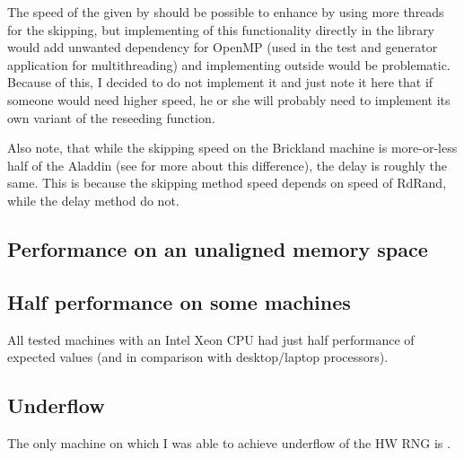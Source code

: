 
The speed of the given by  should be possible to enhance by using more threads for the skipping, but implementing of this functionality directly in the library would add unwanted dependency for OpenMP (used in the test and generator application for multithreading) and implementing outside would be problematic. Because of this, I decided to do not implement it and just note it here that if someone would need higher speed, he or she will probably need to implement its own variant of the reseeding function.

Also note, that while the skipping speed on the Brickland machine is more-or-less half of the Aladdin (see  for more about this difference), the delay is roughly the same. This is because the skipping method speed depends on speed of RdRand, while the delay method do not.


\subsection{Performance on an unaligned memory space}


\subsection{Half performance on some machines}\label{subsec:testing:halfPerf}
All tested machines with an Intel Xeon CPU had just half performance of expected values (and in comparison with desktop/laptop processors).


\subsection{Underflow}
The only machine on which I was able to achieve underflow of the HW RNG is .



